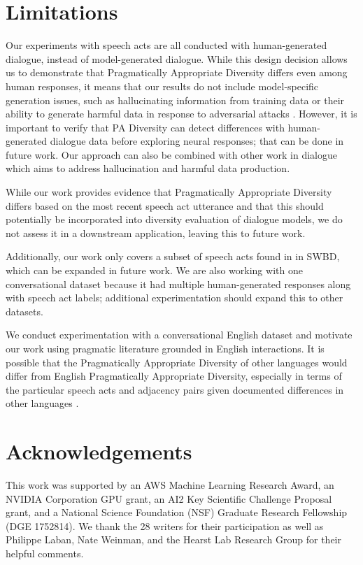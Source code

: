 \documentclass[11pt]{article}
\newcommand{\ediv}{Pragmatically Appropriate Diversity}
\newcommand{\edivspace}{Pragmatically Appropriate Diversity }
\newcommand{\edivshortspace}{PA Diversity }
\begin{document}
\section*{Limitations}
Our experiments with speech acts are all conducted with human-generated dialogue, instead of model-generated dialogue.  While this design decision allows us to demonstrate that \edivspace differs even among human responses, it means that our results do not include model-specific generation issues, such as hallucinating information from training data \cite{roller-etal-2021-recipes} or their ability to generate harmful data in response to adversarial attacks \cite{xu-etal-2021-bot}.  However, it is important to verify that \edivshortspace can detect differences with human-generated dialogue data before exploring neural responses; that  can be done in future work. 
Our approach can also be combined with other work in dialogue which aims to address hallucination and harmful data production.

While our work provides evidence that \edivspace differs based on the most recent speech act utterance and that this should potentially be incorporated into diversity evaluation of dialogue models, we do not assess it in a  downstream application, leaving  this to future work.  

Additionally, our work only covers a subset of speech acts found in in SWBD, which can be expanded in future work.  We are also working with one conversational dataset because it had multiple human-generated responses along with speech act labels; additional experimentation should expand this to other datasets.

We conduct experimentation with a conversational English dataset and motivate our work using pragmatic literature grounded in English interactions.  It is possible that the \edivspace of other languages would  differ from English \ediv, especially in terms of the particular speech acts and adjacency pairs given documented differences in other languages \cite{huth}.

\section*{Acknowledgements}
This work was supported by an AWS Machine Learning Research Award, an NVIDIA Corporation GPU grant, an AI2 Key Scientific Challenge Proposal grant, and a National Science Foundation (NSF) Graduate Research Fellowship (DGE 1752814). We thank the 28 writers for their participation as well as Philippe Laban, Nate Weinman, and the Hearst Lab Research Group for their helpful comments.  
\end{document}

